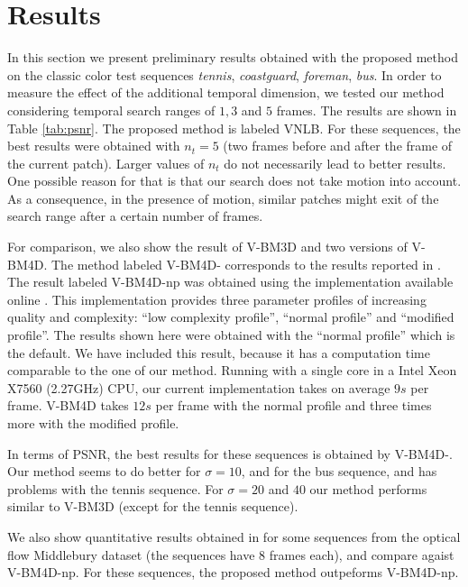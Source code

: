 \documentclass{llncs}
\begin{document}
\section{Results}
\label{sec:results}

In this section we present preliminary results obtained with the proposed
method on the classic color test sequences \emph{tennis}, \emph{coastguard}, \emph{foreman},
\emph{bus}. In order to measure the effect of the additional temporal
dimension, we tested our method considering temporal search ranges of $1, 3$ and $5$ frames.
The results are shown in Table \ref{tab:psnr}. The proposed method is labeled VNLB.
For these sequences, the best results were obtained with
$n_t = 5$ (two frames before and after the frame of the current patch). Larger 
values of $n_t$ do not necessarily lead to better results. One possible reason
for that is that our search does not take motion into account. As a
consequence, in the presence of motion, similar patches might exit of the
search range after a certain number of frames.

For comparison, we also show the result of V-BM3D and two versions of V-BM4D.
The method labeled V-BM4D-\cite{Maggioni2012} corresponds to the results reported
in \cite{Maggioni2012}. The result labeled V-BM4D-np was obtained using the implementation
available online \cite{bm4dcode}. This implementation provides three parameter
profiles of increasing quality and complexity: ``low complexity profile'', ``normal
profile'' and ``modified profile''. The results shown here were obtained with the
``normal profile'' which is the default. We have included this result, because
it has a computation time comparable to the one of our method. Running with a
single core in a Intel Xeon X7560 (2.27GHz) CPU, 
our current implementation takes on average $9s$ per frame. V-BM4D takes $12s$
per frame with the normal profile and three times more with the modified profile. 

In terms of PSNR, the best results for these sequences is obtained by
V-BM4D-\cite{Maggioni2012}. Our method seems to do better for $\sigma = 10$,
and for the bus sequence, and has problems with the tennis sequence. For
$\sigma = 20$ and $40$ our method performs similar to V-BM3D (except for the
tennis sequence). 

We also show quantitative results obtained in for some sequences from the
optical flow Middlebury dataset (the sequences have 8 frames each), and compare
agaist V-BM4D-np. For these sequences, the proposed method outpeforms V-BM4D-np. 
\end{document}
